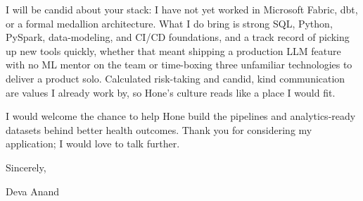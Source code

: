 \documentclass[letterpaper,11pt]{article}
\begin{document}
I will be candid about your stack: I have not yet worked in Microsoft Fabric, dbt, or a formal medallion architecture. What I do bring is strong SQL, Python, PySpark, data-modeling, and CI/CD foundations, and a track record of picking up new tools quickly, whether that meant shipping a production LLM feature with no ML mentor on the team or time-boxing three unfamiliar technologies to deliver a product solo. Calculated risk-taking and candid, kind communication are values I already work by, so Hone's culture reads like a place I would fit.

I would welcome the chance to help Hone build the pipelines and analytics-ready datasets behind better health outcomes. Thank you for considering my application; I would love to talk further.

\vspace{6pt}

Sincerely,

\vspace{4pt}

Deva Anand
\end{document}
